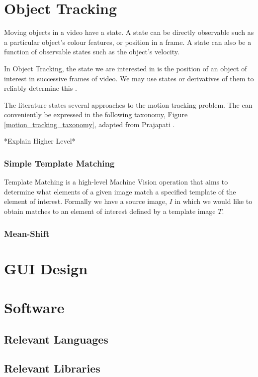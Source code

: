 \section{Object Tracking}
Moving objects in a video have a state. A state can be directly observable such as a
particular object's colour features, or position in a frame. A state can also be a function
of observable states such as the object's velocity.

In Object Tracking, the state we are interested in is the position of an object
of interest in successive frames of video. We may use states or derivatives of
them to reliably determine this \cite{Forsyth2012}.

The literature states several approaches to the motion tracking problem. The can
conveniently be expressed in the following taxonomy, Figure \ref{motion_tracking_taxonomy},
adapted from Prajapati \cite{Prajapati2015}.


*Explain Higher Level*

\subsubsection{Simple Template Matching}
Template Matching is a high-level Machine Vision operation that aims to determine
what elements of a given image match a specified template of the element of
interest.
Formally we have a source image, $I$ in which we would like to obtain matches to
an element of interest defined by a template image $T$.

\subsubsection{Mean-Shift} \label{literature_review_mean_shift}


\section{GUI Design}

\section{Software}

\subsection{Relevant Languages}

\subsection{Relevant Libraries}




